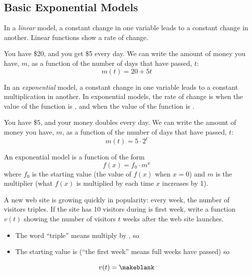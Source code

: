 \subsection{Basic Exponential Models} 
In a \emph{linear} model, a constant change in one variable leads to a constant change in another. Linear functions show a \makeblank[1in] rate of change.
\begin{Example}
You have \$20, and you get \$5 every day. We can write the amount of money you have, $m$, as a function of the number of days that have passed, $t$:
\[
m(t)=20+5t
\]
\end{Example}
In an \emph{exponential} model, a constant change in one variable leads to a constant multiplication in another. In exponential models, the rate of change is \makeblank[1in] when the value of the function is \makeblank[1in], and \makeblank[1in] when the value of the function is \makeblank[1in].
\begin{Example}
You have \$5, and your money doubles every day. We can write the amount of money you have, $m$, as a function of the number of days that have passed, $t$:
\[
m(t)=5\cdot 2^t
\]
\end{Example}
\begin{displaybox}
An exponential model is a function of the form
\[
f(x)=f_0\cdot m^x
\]
where $f_0$ is the starting value (the value of $f(x)$ when $x=0$) and $m$ is the multiplier (what $f(x)$ is multiplied by each time $x$ increases by 1).
\end{displaybox}
\begin{Example}
A new web site is growing quickly in popularity: every week, the number of visitors triples. If the site has 10 visitors during is first week, write a function $v(t)$ showing the number of visitors $t$ weeks after the web site launches.
\begin{itemize}
\item The word ``triple'' means multiply by \makeblanksmall, so \makeblank[1in]
\item The starting value is \makeblanksmall (``the first week'' means \makeblanksmall full weeks have passed) so \makeblank[1in]
\end{itemize}
\[
v(t)=\makeblank
\]
\end{Example}